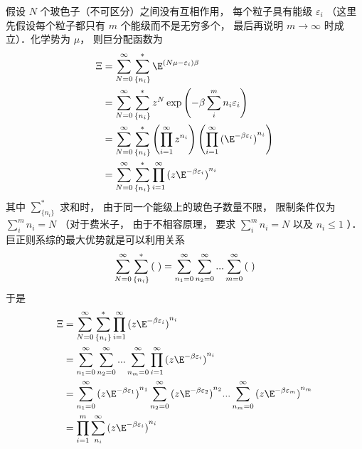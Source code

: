 
假设 $N$ 个玻色子（不可区分）之间没有互相作用， 每个粒子具有能级 ${\varepsilon_i}$ （这里先假设每个粒子都只有 $m$ 个能级而不是无穷多个， 最后再说明 $m \to \infty $ 时成立）．化学势为 $\mu $，  则巨分配函数为
\begin{equation}
  \begin{aligned}
\Xi & = \sum\limits_{N = 0}^\infty  {\sum\limits_{\{ {n_i}\} }^ *  {\E^{(N\mu  - {\varepsilon_i})\beta }} }  \\
& = \sum\limits_{N = 0}^\infty  {\sum\limits_{\{ {n_i}\} }^ *  {{z^N}\exp \left( { - \beta \sum\limits_i^m {{n_i}{\varepsilon_i}} } \right)} }  \\
& = \sum\limits_{N = 0}^\infty  {\sum\limits_{\{ {n_i}\} }^ *  {\left( {\prod\limits_{i = 1}^\infty  {z^{n_i}} } \right)\left( {\prod\limits_{i = 1}^\infty  {{({\E^{ - \beta {\varepsilon_i}}})}^{n_i}} } \right)} } \\
& = \sum\limits_{N = 0}^\infty  {\sum\limits_{\{ {n_i}\} }^ *  {\prod\limits_{i = 1}^\infty  {{(z{\E^{ - \beta {\varepsilon_i}}})}^{n_i}} } }
\end{aligned}
\end{equation}
其中 $\sum\limits_{\{ {n_i}\} }^ *  {} $ 求和时， 由于同一个能级上的玻色子数量不限， 限制条件仅为 $\sum\limits_i^m {{n_i}}  = N$ （对于费米子， 由于不相容原理， 要求 $\sum\limits_i^m {{n_i}}  = N$ 以及 ${n_i} \le 1$ ）．\\
巨正则系综的最大优势就是可以利用关系
\begin{equation}
  \sum\limits_{N = 0}^\infty  {\sum\limits_{\{ {n_i}\} }^ *  {({\kern 1pt} {\kern 1pt} {\kern 1pt} )} }  = \sum\limits_{{n_1} = 0}^\infty  {\sum\limits_{{n_2} = 0}^\infty  {...\sum\limits_{m = 0}^\infty  {({\kern 1pt} {\kern 1pt} {\kern 1pt} )} } } 
\end{equation}
于是
\begin{equation}
  \begin{aligned}
\Xi & = \sum\limits_{N = 0}^\infty  {\sum\limits_{\{ {n_i}\} }^ *  {\prod\limits_{i = 1}^\infty  {{(z{\E^{ - \beta {\varepsilon_i}}})}^{n_i}} } }  \\
& = \sum\limits_{{n_1} = 0}^\infty  {\sum\limits_{{n_2} = 0}^\infty  {...\sum\limits_{{n_m} = 0}^\infty  {\prod\limits_{i = 1}^\infty  {{(z{\E^{ - \beta {\varepsilon_i}}})}^{n_i}} } } }  \\
& = \sum\limits_{{n_1} = 0}^\infty  {{{(z{\E^{ - \beta {\varepsilon_1}}})}^{n_1}}\sum\limits_{{n_2} = 0}^\infty  {{{(z{\E^{ - \beta {\varepsilon_2}}})}^{n_2}}...\sum\limits_{{n_m} = 0}^\infty  {{(z{\E^{ - \beta {\varepsilon_m}}})}^{n_m}} } } \\
& = \prod\limits_{i = 1}^m {\sum\limits_{n_i}^\infty  {{(z{\E^{ - \beta {\varepsilon_i}}})}^{n_i}} }
\end{aligned}
\end{equation}
